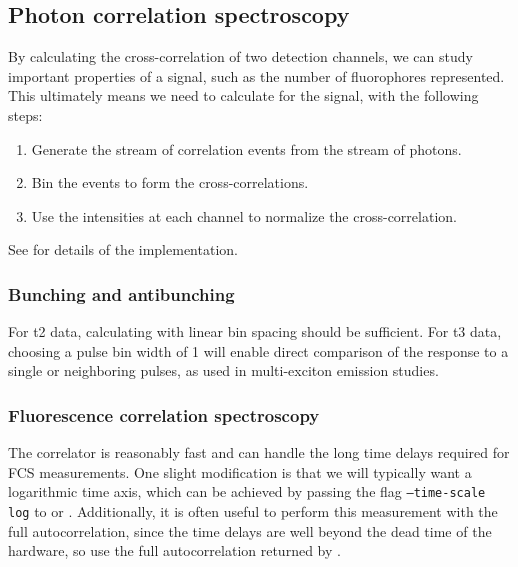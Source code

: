 \subsection{Photon correlation spectroscopy}
By calculating the cross-correlation of two detection channels, we can study important properties of a signal, such as the number of fluorophores represented. This ultimately means we need to calculate  for the signal, with the following steps:
\begin{enumerate}
\item Generate the stream of correlation events from the stream of photons.
\item Bin the events to form the cross-correlations.
\item Use the intensities at each channel to normalize the cross-correlation.
\end{enumerate}
See \GN{} for details of the implementation.

\subsubsection{Bunching and antibunching}
For t2 data, calculating  with linear bin spacing should be sufficient. For t3 data, choosing a pulse bin width of 1 will enable direct comparison of the response to a single or neighboring pulses, as used in multi-exciton emission studies.

\subsubsection{Fluorescence correlation spectroscopy}
The correlator is reasonably fast and can handle the long time delays required for FCS measurements. One slight modification is that we will typically want a logarithmic time axis, which can be achieved by passing the flag \texttt{--time-scale log} to \GN{} or . Additionally, it is often useful to perform this measurement with the full autocorrelation, since the time delays are well beyond the dead time of the hardware, so use the full autocorrelation returned by \GN.